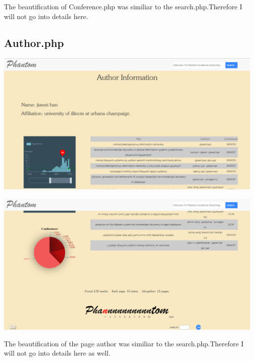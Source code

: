\documentclass[10pt,twoside,a4paper,titlepage]{article}
\begin{document}
	The beautification of Conference.php was similiar to the search.php.Therefore I will not go into details here.
	
	\subsection{Author.php}
	
	 \hspace*{\fill} 
	\begin{flushleft}
		\includegraphics[width=1.0\textwidth]{cyf/author1.PNG}
		\newline
		
		\includegraphics[width=1.0\textwidth]{cyf/author2.PNG}
	\end{flushleft}

	The beautification of the page author was similiar to the search.php.Therefore I will not go into details here as well.
	
\end{document}
